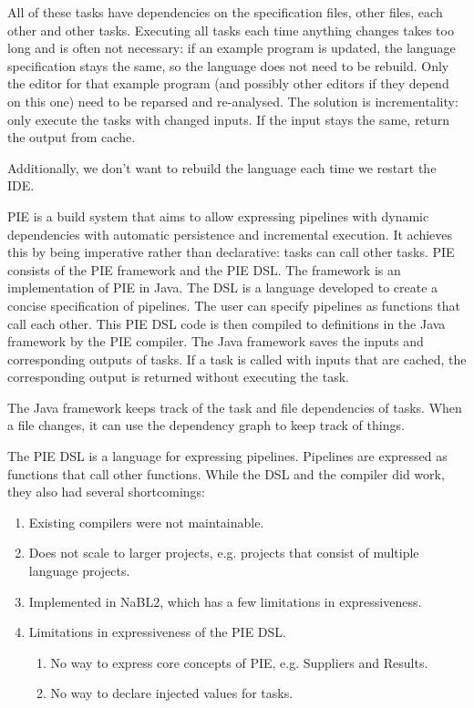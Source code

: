 All of these tasks have dependencies on the specification files, other files, each other and other tasks.
Executing all tasks each time anything changes takes too long and is often not necessary: if an example program is updated, the language specification stays the same, so the language does not need to be rebuild.
Only the editor for that example program (and possibly other editors if they depend on this one) need to be reparsed and re-analysed.
The solution is incrementality: only execute the tasks with changed inputs.
If the input stays the same, return the output from cache.

Additionally, we don't want to rebuild the language each time we restart the IDE.


\Ac{PIE} is a build system that aims to allow expressing pipelines with dynamic dependencies with automatic persistence and incremental execution.
It achieves this by being imperative rather than declarative: tasks can call other tasks.
\Ac{PIE} consists of the PIE framework and the \ac{PIE} \ac{DSL}.
The framework is an implementation of \ac{PIE} in Java.
The \ac{DSL} is a language developed to create a concise specification of pipelines.
The user can specify pipelines as functions that call each other.
This \ac{PIE} \ac{DSL} code is then compiled to definitions in the Java framework by the \ac{PIE} compiler.
The Java framework saves the inputs and corresponding outputs of tasks.
If a task is called with inputs that are cached, the corresponding output is returned without executing the task.

The Java framework keeps track of the task and file dependencies of tasks.
When a file changes, it can use the dependency graph to keep track of things.

The PIE DSL is a language for expressing pipelines.
Pipelines are expressed as functions that call other functions.
While the DSL and the compiler did work, they also had several shortcomings:
\begin{enumerate}
  \item Existing compilers were not maintainable.
  \item Does not scale to larger projects, e.g. projects that consist of multiple language projects.
  \item Implemented in NaBL2, which has a few limitations in expressiveness.
  \item Limitations in expressiveness of the PIE DSL.
  \begin{enumerate}
    \item No way to express core concepts of PIE, e.g. Suppliers and Results.
    \item No way to declare injected values for tasks.
  \end{enumerate}
\end{enumerate}





